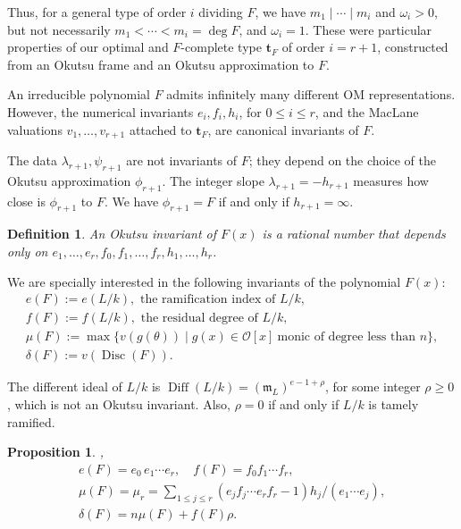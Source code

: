 \documentclass{amsart}
\newtheorem{definition}[theorem]{Definition}
\newtheorem{proposition}[theorem]{Proposition}
\begin{document}
Thus, for a general type of order $i$ dividing $F$, we have $m_1\mid\cdots\mid m_i$ and $\omega_i>0$, but not necessarily $m_1<\cdots<m_i=\deg F$, and $\omega_i=1$. These were particular properties of our optimal and $F$-complete type ${\mathbf{t}}_F$ of order $i=r+1$, constructed from an Okutsu frame and an Okutsu approximation to $F$. 

An irreducible polynomial $F$ admits infinitely many different OM representations. However, the numeri\-cal invariants $e_i,f_i,h_i$, for $0\le i\le r$, and the MacLane valuations 
$v_1,\dots,v_{r+1}$ attached to ${\mathbf{t}}_F$, are canonical invariants of $F$. 

The data $\lambda_{r+1},\psi_{r+1}$ are not invariants of $F$; they depend on the choice of the Okutsu approximation $\phi_{r+1}$. The integer slope $\lambda_{r+1}=-h_{r+1}$ measures how close is $\phi_{r+1}$ to $F$. We have $\phi_{r+1}=F$ if and only if $h_{r+1}=\infty$.
 
\begin{definition}
An \emph{Okutsu invariant} of $F(x)$ is a rational number that depends only on $e_1,\dots,e_r,f_0,f_1,\dots,f_r,h_1,\dots,h_r$.
\end{definition}

We are specially interested in the following invariants of the polynomial $F(x)$:
$$
\begin{array}{l}
e(F):=e(L/k),  \mbox{ the ramification index of }L/k,\\
f(F):=f(L/k), \mbox{ the residual degree of }L/k,\\
\mu(F):=\max\{v(g({\theta}))\mid g(x)\in{\mathcal{O}}[x] \ \mbox{monic of degree less than }n\},\\
\delta(F):=v({\operatorname{Disc}}(F)).
\end{array}
$$

The different ideal of $L/k$ is ${\operatorname{Diff}}(L/k)=({{\mathfrak m}}_L)^{e-1+\rho}$, for some integer $\rho\ge0$, which is not an Okutsu invariant. Also, $\rho=0$ if and only if $L/k$ is tamely ramified. 

\begin{proposition}{\cite[Cor. 3.8]{HN}, \cite[Cor. 1.8]{Ndiff}}\label{okutsu}
$${}
\begin{array}{l}
e(F)=e_0\,e_1\cdots e_r,\quad f(F)=f_0f_1\cdots f_r,\\
\mu(F)=\mu_r=\sum_{1\le j\le r}(e_jf_j\cdots e_rf_r-1)h_j/(e_1\cdots e_j),\\
\delta(F)=n\mu(F)+f(F)\rho.
\end{array}
$$
\end{proposition}
\end{document}
